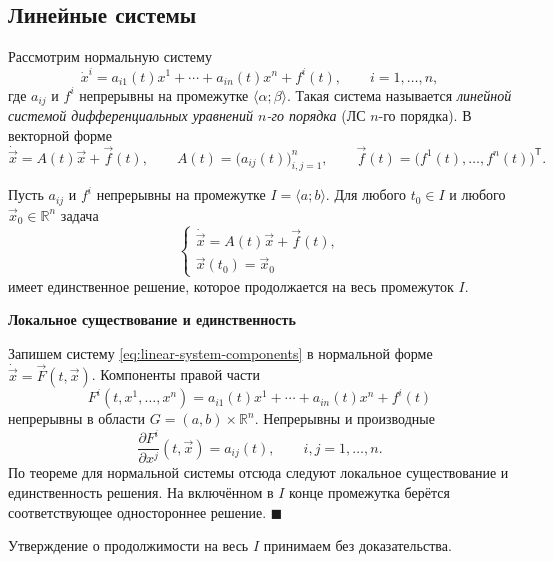 \documentclass[12pt,a4paper]{article}
\numberwithin{equation}{section}
\newcommand{\R}{\mathbb{R}}
\newcommand{\vect}[1]{\vec{#1}}
\renewenvironment{proof}[1][Доказательство]{\begin{center}\textbf{#1}\end{center}}{\hfill$\blacksquare$\par}
\begin{document}
\subsection{Линейные системы}
\begin{definitionHSE}
Рассмотрим нормальную систему
\begin{equation}
 \dot{x}^i=a_{i1}(t)x^1+\cdots+a_{in}(t)x^n+f^i(t),
 \qquad i=1,\ldots,n,
 \label{eq:linear-system-components}
\end{equation}
где $a_{ij}$ и $f^i$ непрерывны на промежутке $\langle\alpha;\beta\rangle$.
Такая система называется \textit{линейной системой дифференциальных
уравнений $n$-го порядка} (ЛС $n$-го порядка). В векторной форме
\[
 \dot{\vect{x}}=A(t)\vect{x}+\vect{f}(t),\qquad A(t)=\bigl(a_{ij}(t)\bigr)_{i,j=1}^n,
 \qquad \vect{f}(t)=\bigl(f^1(t),\ldots,f^n(t)\bigr)^{\mathsf T}.
\]
\end{definitionHSE}

\begin{theoremHSE}
Пусть $a_{ij}$ и $f^i$ непрерывны на промежутке $I=\langle a;b\rangle$.
Для любого $t_0\in I$ и любого $\vect{x}_0\in\R^n$ задача
\[
\begin{cases}
\dot{\vect{x}}=A(t)\vect{x}+\vect{f}(t),\\
\vect{x}(t_0)=\vect{x}_0
\end{cases}
\]
имеет единственное решение, которое продолжается на весь промежуток $I$.
\end{theoremHSE}

\begin{proof}[Локальное существование и единственность]
Запишем систему \eqref{eq:linear-system-components} в нормальной форме
$\dot{\vect{x}}=\vect F(t,\vect{x})$. Компоненты правой части
\[
 F^i(t,x^1,\ldots,x^n)
 =a_{i1}(t)x^1+\cdots+a_{in}(t)x^n+f^i(t)
\]
непрерывны в области $G=(a,b)\times\R^n$. Непрерывны и производные
\[
 \frac{\partial F^i}{\partial x^j}(t,\vect{x})=a_{ij}(t),
 \qquad i,j=1,\ldots,n .
\]
По теореме для нормальной системы отсюда следуют локальное существование
и единственность решения. На включённом в $I$ конце промежутка
берётся соответствующее одностороннее решение.
\end{proof}
Утверждение о продолжимости на весь $I$ принимаем без доказательства.
\end{document}
